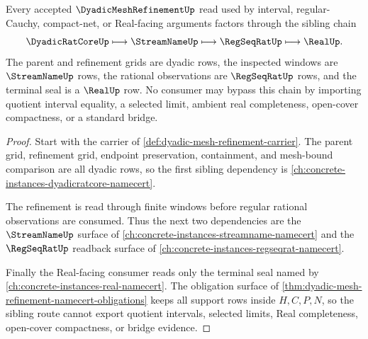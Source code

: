 \begin{theorem}
\label{thm:dyadic-mesh-refinement-sibling-route}
Every accepted $\DyadicMeshRefinementUp$ read used by interval, regular-Cauchy, compact-net, or Real-facing arguments factors through the sibling chain
$$
\DyadicRatCoreUp \longmapsto \StreamNameUp \longmapsto \RegSeqRatUp \longmapsto \RealUp .
$$
The parent and refinement grids are dyadic rows, the inspected windows are $\StreamNameUp$ rows, the rational observations are $\RegSeqRatUp$ rows, and the terminal seal is a $\RealUp$ row. No consumer may bypass this chain by importing quotient interval equality, a selected limit, ambient real completeness, open-cover compactness, or a standard bridge.
\end{theorem}
\begin{proof}
Start with the carrier of \autoref{def:dyadic-mesh-refinement-carrier}. The parent grid, refinement grid, endpoint preservation, containment, and mesh-bound comparison are all dyadic rows, so the first sibling dependency is \autoref{ch:concrete-instances-dyadicratcore-namecert}.

The refinement is read through finite windows before regular rational observations are consumed. Thus the next two dependencies are the $\StreamNameUp$ surface of \autoref{ch:concrete-instances-streamname-namecert} and the $\RegSeqRatUp$ readback surface of \autoref{ch:concrete-instances-regseqrat-namecert}.

Finally the Real-facing consumer reads only the terminal seal named by \autoref{ch:concrete-instances-real-namecert}. The obligation surface of \autoref{thm:dyadic-mesh-refinement-namecert-obligations} keeps all support rows inside $H,C,P,N$, so the sibling route cannot export quotient intervals, selected limits, Real completeness, open-cover compactness, or bridge evidence.
\end{proof}



